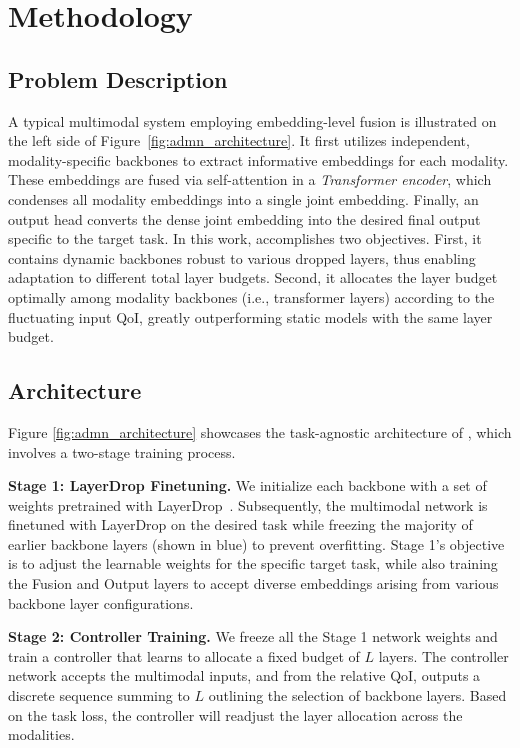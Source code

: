 \section{Methodology}


\subsection{Problem Description}

A typical multimodal system employing embedding-level fusion is illustrated on the left side of Figure~\ref{fig:admn_architecture}.
It first utilizes independent, modality-specific backbones to extract informative embeddings for each modality.  
These embeddings are fused via self-attention in a \emph{Transformer encoder}, which condenses all modality embeddings into a single joint embedding.  
Finally, an output head converts the dense joint embedding into the desired final output specific to the target task. 
In this work, \name accomplishes two objectives. First, it contains dynamic backbones robust to various dropped layers, thus enabling adaptation to different total layer budgets. Second, it allocates the layer budget optimally among modality backbones (i.e., transformer layers) according to the fluctuating input QoI, greatly outperforming static models with the same layer budget.


\subsection{\name Architecture}
Figure \ref{fig:admn_architecture} showcases the task-agnostic architecture of \name, which involves a two-stage training process.

\textbf{Stage 1: LayerDrop Finetuning.}
We initialize each backbone with a set of weights pretrained with LayerDrop~\cite{fan2019reducing}. Subsequently, the multimodal network is finetuned with LayerDrop on the desired task while freezing the majority of earlier backbone layers (shown in blue) to prevent overfitting. 
Stage 1's objective is to adjust the learnable weights for the specific target task, while also training the Fusion and Output layers to accept diverse embeddings arising from various backbone layer configurations.


\textbf{Stage 2: Controller Training.}
We freeze all the Stage 1 network weights and train a controller that learns to allocate a fixed budget of $L$ layers. 
The controller network accepts the multimodal inputs, and from the relative QoI, outputs a discrete sequence summing to $L$ outlining the selection of backbone layers. 
Based on the task loss, the controller will readjust the layer allocation across the modalities. 



